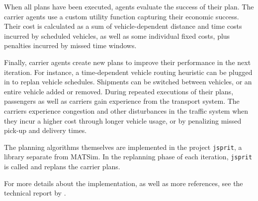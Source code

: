 When all plans have been executed, agents evaluate the success of their plan. The carrier agents use a custom 
utility function capturing their economic success. Their cost is calculated as a sum of vehicle-dependent 
distance and time costs incurred by scheduled vehicles, as well as some individual fixed costs, plus penalties 
incurred by missed time windows.

Finally, carrier agents create new plans to improve their performance in the next iteration. For instance, a time-dependent vehicle routing heuristic can be plugged in to replan vehicle schedules. Shipments can be switched between vehicles, or an entire vehicle added or removed.
During repeated executions of their plans, passengers as well as carriers gain experience from the transport system. The carriers experience congestion and other disturbances in the traffic system when they incur a higher cost through longer vehicle usage, or by penalizing missed pick-up and delivery times.

The planning algorithms themselves are implemented in the project \lstinline|jsprit|, a library separate from MATSim.
In the replanning phase of each iteration, \lstinline|jsprit| is called and replans the carrier plans.

For more details about the implementation, as well as more references, see the technical report by \citet[][]{ZilskeEtAl_TechRep_VSP_2012}.


